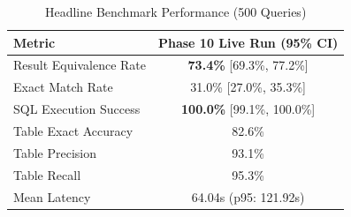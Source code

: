 \begin{table}[t]
\centering
\small
\caption{Headline Benchmark Performance (500 Queries)}
\label{tab:headline_performance}
\begin{tabular}{lc}
\toprule
\textbf{Metric} & \textbf{Phase 10 Live Run (95\% CI)} \\
\midrule
Result Equivalence Rate & \textbf{73.4\%} [69.3\%, 77.2\%] \\
Exact Match Rate & 31.0\% [27.0\%, 35.3\%] \\
SQL Execution Success & \textbf{100.0\%} [99.1\%, 100.0\%] \\
Table Exact Accuracy & 82.6\% \\
Table Precision & 93.1\% \\
Table Recall & 95.3\% \\
Mean Latency & 64.04s (p95: 121.92s) \\
\bottomrule
\end{tabular}
\end{table}